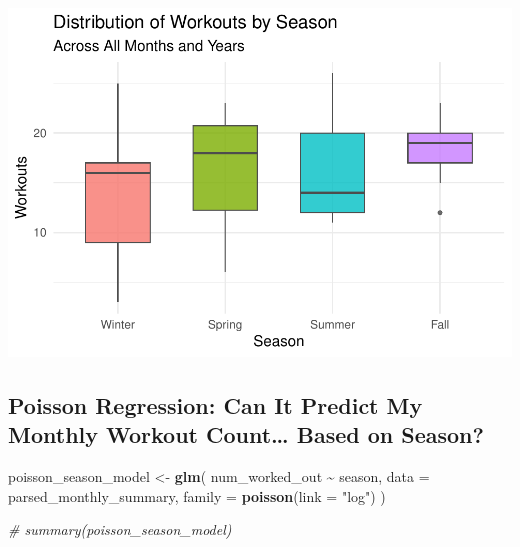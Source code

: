 \documentclass[
  11pt,
]{article}
\newenvironment{Shaded}{\begin{snugshade}}{\end{snugshade}}
\newcommand{\AttributeTok}[1]{\textcolor[rgb]{0.13,0.29,0.53}{#1}}
\newcommand{\CommentTok}[1]{\textcolor[rgb]{0.56,0.35,0.01}{\textit{#1}}}
\newcommand{\FunctionTok}[1]{\textcolor[rgb]{0.13,0.29,0.53}{\textbf{#1}}}
\newcommand{\NormalTok}[1]{#1}
\newcommand{\OtherTok}[1]{\textcolor[rgb]{0.56,0.35,0.01}{#1}}
\newcommand{\SpecialCharTok}[1]{\textcolor[rgb]{0.81,0.36,0.00}{\textbf{#1}}}
\newcommand{\StringTok}[1]{\textcolor[rgb]{0.31,0.60,0.02}{#1}}
\begin{document}
\includegraphics{analysis_files/figure-latex/unnamed-chunk-14-1.pdf}

\subsection{Poisson Regression: Can It Predict My Monthly Workout
Count\ldots{} Based on
Season?}\label{poisson-regression-can-it-predict-my-monthly-workout-count-based-on-season}

\begin{Shaded}
\begin{Highlighting}[]
\NormalTok{poisson\_season\_model }\OtherTok{\textless{}{-}} \FunctionTok{glm}\NormalTok{(}
\NormalTok{  num\_worked\_out }\SpecialCharTok{\textasciitilde{}}\NormalTok{ season,}
  \AttributeTok{data =}\NormalTok{ parsed\_monthly\_summary,}
  \AttributeTok{family =} \FunctionTok{poisson}\NormalTok{(}\AttributeTok{link =} \StringTok{"log"}\NormalTok{)}
\NormalTok{)}

\CommentTok{\# summary(poisson\_season\_model)}
\end{Highlighting}
\end{Shaded}
\end{document}
